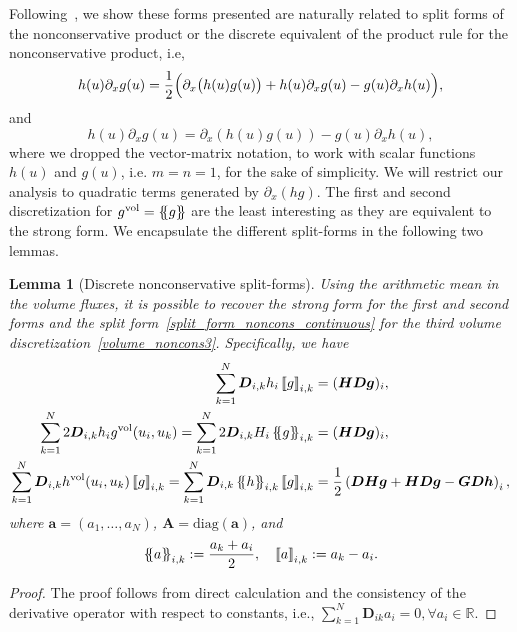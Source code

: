 \documentclass[]{scrartcl}
\newcommand*{\ldblbrace}{\{\mskip-5mu \left \{}
\newcommand*{\rdblbrace}{ \}\mskip-5mu \right \}}
\newcommand{\mean}[1]{\left\ldblbrace #1 \right\rdblbrace}
\newcommand{\mtx}[1]{\boldsymbol{#1}}
\renewcommand{\vec}[1]{\boldsymbol{#1}}
\newcommand{\jump}[1]{\left\llbracket #1  \right\rrbracket}
\newtheorem{lemma}[theorem]{Lemma}
\theoremstyle{definition}
\begin{document}
Following~\cite{gassner2016split}, we show these forms presented are naturally related to split forms of the nonconservative product or the discrete equivalent of the product rule for the nonconservative product, i.e,
\begin{equation}
h(u) \partial_x g(u) = \frac{1}{2} \Bigl ( \partial_x \bigl (h(u)g(u) \bigr ) +h(u) \partial_x g(u) - g(u) \partial_x h(u) \Bigr ),
\label{split_form_noncons_continuous}
\end{equation}
and
\begin{equation}
h(u) \partial_x g(u) = \partial_x (h(u)g(u)) - g(u) \partial_x h(u),
\label{discrete_rule_noncons}
\end{equation}
where we dropped the vector-matrix notation, to work with scalar functions $h(u)$ and $g(u)$, i.e. $m = n = 1$, for the sake of simplicity.
We will restrict our analysis to quadratic terms generated by $\partial_x  ( hg  )$.
The first and second discretization for $g^{\mathrm{vol}} = \mean{g}$ are the least interesting as they are equivalent to the strong form.
We encapsulate the different split-forms in the following two lemmas.
\begin{lemma}[Discrete nonconservative split-forms]
    Using the arithmetic mean in the volume fluxes, it is possible to recover the strong form for the first and second forms and the split form~\eqref{split_form_noncons_continuous} for the third volume discretization~\eqref{volume_noncons3}.
    Specifically, we have
    \begin{equation}
    \begin{aligned}
        \sum_{k=1}^N \mtx{D}_{i,k} h_i \jump{g}_{i,k}
        &=
        (\mtx{H} \mtx{D} \vec{g})_i,
        \\
        \sum_{k=1}^N 2 \mtx{D}_{i,k} h_i g^{\mathrm{vol}}(u_i,u_k)
        =
        \sum_{k=1}^N 2\mtx{D}_{i,k}H_i \mean{g}_{i,k}
        &=
        (\mtx{H} \mtx{D} \vec{g})_i,
        \\
        \sum_{k=1}^N  \mtx{D}_{i,k} h^{\mathrm{vol}} (u_i,u_k) \jump{g}_{i,k}
        =
        \sum_{k=1}^N \mtx{D}_{i,k} \mean{h}_{i,k} \jump{g}_{i,k}
        &=
        \frac{1}{2} \left (\mtx{D} \mtx{H} \vec{g} + \mtx{H}  \mtx{D} \vec{g} - \mtx{G} \mtx{D} \vec{h} \right )_i,
    \end{aligned}
    \end{equation}
    where $\vec{a} = (a_1, \dots, a_N)$, $\mtx{A} = \text{diag}(\vec{a})$, and
    \begin{equation}
        \begin{aligned}
        \mean{a}_{i,k} := \frac{a_k + a_i}{2}, \quad \jump{a}_{i,k} := a_k - a_i.
        \end{aligned}
    \end{equation}
\end{lemma}
\begin{proof}
The proof follows from direct calculation and the consistency of the derivative operator with respect to constants, i.e., $\sum_{k=1}^{N} \mtx{D}_{ik} a_i = 0, \forall a_i \in \mathbb{R}$.
\end{proof}
\end{document}
